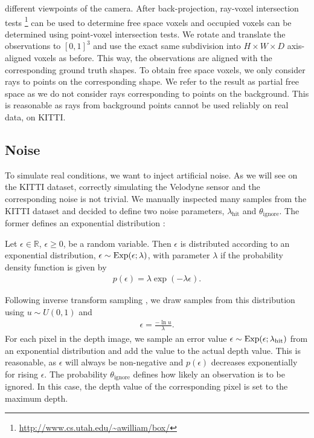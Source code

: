 different viewpoints of the camera. After back-projection,
ray-voxel intersection tests \cite{WilliamsBarrusMorleyShirley:2005}\footnote{
  \url{http://www.cs.utah.edu/~awilliam/box/}
} can be used to determine free space voxels and occupied voxels can be determined
using point-voxel intersection tests. We rotate and translate the observations
to $[0, 1]^3$ and use the exact same subdivision into $H \times W \times D$
axis-aligned voxels as before. This way, the observations are aligned with the
corresponding ground truth shapes. To obtain free space voxels, we only consider
rays to points on the corresponding shape. We refer to the result as partial
free space as we do not consider rays corresponding to points on the background.
This is reasonable as rays from background points cannot be used reliably
on real data, \eg on KITTI.

\subsection{Noise}

To simulate real conditions, we want to inject artificial noise.  As we will see on the
KITTI dataset, correctly simulating the Velodyne sensor and the corresponding noise is
not trivial. We manually inspected many samples from the KITTI dataset and decided
to define two noise parameters, $\lambda_{\text{hit}}$ and $\theta_{\text{ignore}}$.
The former defines an exponential distribution \cite[Chapter~11]{Bishop:2006}:

\begin{definition}
  Let $\epsilon \in \mathbb{R}$, $\epsilon \geq 0$, be a random variable.
  Then $\epsilon$ is distributed according to
  an exponential distribution, \ie $\epsilon \sim \mathrm{Exp}(\epsilon;\lambda)$, with 
  parameter $\lambda$ if the probability density function is given by
  \begin{align}
    p(\epsilon) = \lambda \exp(-\lambda \epsilon).
  \end{align}
\end{definition}

Following inverse transform sampling \cite[Chapter~11]{Bishop:2006},
we draw samples from this distribution using $u \sim U(0,1)$ and
\begin{align}
  \epsilon = \frac{-\ln u}{\lambda}.
\end{align}
For each pixel in the depth image, we sample an error value
$\epsilon \sim \mathrm{Exp}(\epsilon;\lambda_{\text{hit}})$ from an
exponential distribution and add the value to the actual depth value.
This is reasonable, as $\epsilon$ will always be non-negative and $p(\epsilon)$
decreases exponentially for rising $\epsilon$.
The probability $\theta_{\text{ignore}}$ defines how likely an observation
is to be ignored. In this case, the depth value of the corresponding pixel is
set to the maximum depth.

